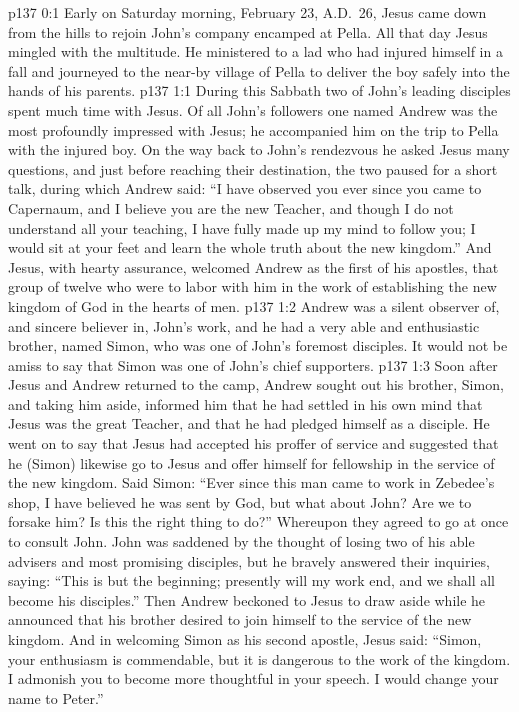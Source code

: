 \author{Midwayer Commission}
\vs p137 0:1 Early on Saturday morning, February 23, A.D.~26, Jesus came down from the hills to rejoin John’s company encamped at Pella. All that day Jesus mingled with the multitude. He ministered to a lad who had injured himself in a fall and journeyed to the near\hyp{}by village of Pella to deliver the boy safely into the hands of his parents.
\vs p137 1:1 During this Sabbath two of John’s leading disciples spent much time with Jesus. Of all John’s followers one named Andrew was the most profoundly impressed with Jesus; he accompanied him on the trip to Pella with the injured boy. On the way back to John’s rendezvous he asked Jesus many questions, and just before reaching their destination, the two paused for a short talk, during which Andrew said: “I have observed you ever since you came to Capernaum, and I believe you are the new Teacher, and though I do not understand all your teaching, I have fully made up my mind to follow you; I would sit at your feet and learn the whole truth about the new kingdom.” And Jesus, with hearty assurance, welcomed Andrew as the first of his apostles, that group of twelve who were to labor with him in the work of establishing the new kingdom of God in the hearts of men.
\pc \vs p137 1:2 Andrew was a silent observer of, and sincere believer in, John’s work, and he had a very able and enthusiastic brother, named Simon, who was one of John’s foremost disciples. It would not be amiss to say that Simon was one of John’s chief supporters.
\vs p137 1:3 Soon after Jesus and Andrew returned to the camp, Andrew sought out his brother, Simon, and taking him aside, informed him that he had settled in his own mind that Jesus was the great Teacher, and that he had pledged himself as a disciple. He went on to say that Jesus had accepted his proffer of service and suggested that he (Simon) likewise go to Jesus and offer himself for fellowship in the service of the new kingdom. Said Simon: “Ever since this man came to work in Zebedee’s shop, I have believed he was sent by God, but what about John? Are we to forsake him? Is this the right thing to do?” Whereupon they agreed to go at once to consult John. John was saddened by the thought of losing two of his able advisers and most promising disciples, but he bravely answered their inquiries, saying: “This is but the beginning; presently will my work end, and we shall all become his disciples.” Then Andrew beckoned to Jesus to draw aside while he announced that his brother desired to join himself to the service of the new kingdom. And in welcoming Simon as his second apostle, Jesus said: \textcolor{ubdarkred}{“Simon, your enthusiasm is commendable, but it is dangerous to the work of the kingdom. I admonish you to become more thoughtful in your speech. I would change your name to Peter.”}
